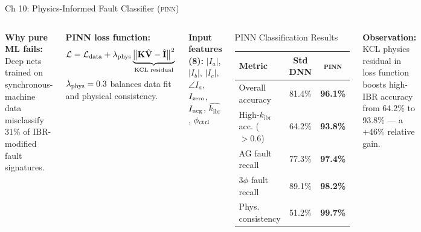 \documentclass[10pt,aspectratio=169]{beamer}
\newcommand{\obs}[1]{%
  {\color{iitmred}\textbf{Observation:} #1}%
}
\newcommand{\kibr}{k_{\mathrm{ibr}}}
\newcommand{\PINN}{\textsc{pinn}}
\begin{document}
\begin{frame}{Ch 10: Physics-Informed Fault Classifier (\PINN)}
  \begin{columns}[T]
      \textbf{Why pure ML fails:} Deep nets trained on
      synchronous-machine data misclassify 31\% of
      IBR-modified fault signatures.

      \medskip
      \textbf{PINN loss function:}
      \[
        \mathcal{L} = \mathcal{L}_{\rm data}
          + \lambda_{\rm phys}
            \underbrace{\bigl\|\mathbf{K}\hat{\mathbf{V}}
              - \hat{\mathbf{I}}\bigr\|^2}_{\text{KCL residual}}
      \]
      $\lambda_{\rm phys} = 0.3$ balances data fit
      and physical consistency.

      \medskip
      \textbf{Input features (8):}
      $|I_a|$, $|I_b|$, $|I_c|$,
      $\angle I_a$, $I_{\rm zero}$, $I_{\rm neg}$,
      $\hat{\kibr}$, $\phi_{\rm ctrl}$

      \begin{block}{\small PINN Classification Results}
        \small
        \begin{tabular}{lcc}
          \toprule
          Metric & Std DNN & \PINN \\
          \midrule
          Overall accuracy & 81.4\% & \textbf{96.1\%}\\
          High-$\kibr$ acc. ($>\!0.6$) & 64.2\% & \textbf{93.8\%}\\
          AG fault recall & 77.3\% & \textbf{97.4\%}\\
          3$\phi$ fault recall & 89.1\% & \textbf{98.2\%}\\
          Phys. consistency & 51.2\% & \textbf{99.7\%}\\
          \bottomrule
        \end{tabular}
      \end{block}
      \vspace{0.2cm}
      \obs{KCL physics residual in loss function
        boosts high-IBR accuracy from 64.2\% to
        93.8\% — a +46\% relative gain.}
  \end{columns}
\end{frame}
\end{document}
